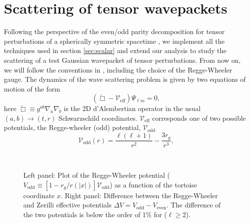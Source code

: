 \documentclass[article,aps,nofootinbib,twocolumn,superscriptaddress]{revtex4-1}
\begin{document}
\section{Scattering of tensor wavepackets}\label{sec:tensor} 
Following the perspective of the even/odd parity decomposition for tensor perturbations of a spherically symmetric spacetime \citep{Regge:1957td, PhysRevD.2.2141, PhysRevD.5.2419}, we implement all the techniques used in section \ref{sec:scalar} and extend our analysis to study the scattering of a test Gaussian wavepacket of tensor perturbations. From now on, we will follow the conventions in \citep{Martel:2005ir}, including the choice of the Regge-Wheeler gauge. 
The dynamics of the wave scattering problem is given by two equations of motion of the form
\begin{equation}
\left(\tilde{\Box}-\mathcal{V}_{\mathrm{eff}}\right)\Psi_{\ell m}=0,
\label{eq:tensor_eq_mov}
\end{equation} 
here $\tilde{\Box}\equiv g^{ab}\nabla_a\nabla_b$ is the 2D d'Alembertian operator in the usual $(a,b)\rightarrow(t,r)$ Schwarzschild coordinates. $\mathcal{V}_{\mathrm{eff}}$ corresponds one of two possible potentials, the Regge-wheeler (odd) potential, $\mathcal{V}_{\mathrm{odd}}$ 
\begin{equation}
\mathcal{V}_{\mathrm{odd}}(r)= \frac{\ell(\ell+1)}{r^2}-\frac{3r_g}{r^3},
\label{eq:V_odd}
\end{equation} 
\begin{figure}
\centering
{} \,
\caption{\label{fig:evenodd_potentials} Left panel: Plot of the Regge-Wheeler potential ($V_{\mathrm{odd}}\equiv[1-r_g/r(|x|)]\mathcal{V}_{\mathrm{odd}}$) as a function of the tortoise coordinate $x$. Right panel: Difference between the Regge-Wheeler and Zerilli effective potentials $\Delta V=V_{\mathrm{odd}}-V_{\mathrm{even}}$. The difference of the two potentials is below the order of 1\% for ($\ell\geq 2$).} 
\end{figure}
\end{document}
